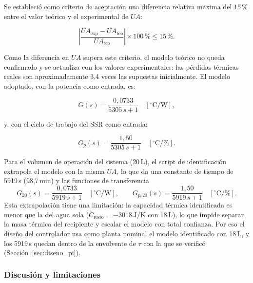 Se estableció como criterio de aceptación una diferencia relativa máxima del $15\,\%$ entre el valor teórico y el experimental de $UA$:

\begin{equation}
\left| \frac{UA_{\mathrm{exp}} - UA_{\mathrm{teo}}}{UA_{\mathrm{teo}}} \right| \times 100\,\% \leq 15\,\%.
\label{eq:criterio_aceptacion}
\end{equation}

Como la diferencia en $UA$ supera este criterio, el modelo teórico no queda confirmado y se actualiza con los valores experimentales: las pérdidas térmicas reales son aproximadamente 3,4 veces las supuestas inicialmente. El modelo adoptado, con la potencia como entrada, es:

\begin{equation}
G(s) = \frac{0{,}0733}{5305\,s + 1}\quad [^{\circ}\mathrm{C/W}],
\label{eq:modelo_experimental}
\end{equation}

y, con el ciclo de trabajo del SSR como entrada:

\begin{equation}
G_p(s) = \frac{1{,}50}{5305\,s + 1}\quad [^{\circ}\mathrm{C}/\%].
\label{eq:modelo_experimental_duty}
\end{equation}

Para el volumen de operación del sistema (20\,L), el script de identificación extrapola el modelo con la misma $UA$, lo que da una constante de tiempo de 5919\,s (98,7\,min) y las funciones de transferencia
\begin{equation}
G_{20}(s) = \frac{0{,}0733}{5919\,s + 1}\quad [^{\circ}\mathrm{C/W}], \qquad G_{p,20}(s) = \frac{1{,}50}{5919\,s + 1}\quad [^{\circ}\mathrm{C}/\%].
\label{eq:modelo_20L}
\end{equation}
Esta extrapolación tiene una limitación: la capacidad térmica identificada es menor que la del agua sola ($C_{\mathrm{resto}} = -3018\,\mathrm{J/K}$ con 18\,L), lo que impide separar la masa térmica del recipiente y escalar el modelo con total confianza. Por eso el diseño del controlador usa como planta nominal el modelo identificado con 18\,L, y los 5919\,s quedan dentro de la envolvente de $\tau$ con la que se verificó (Sección~\ref{sec:diseno_pi}).

\subsubsection{Discusión y limitaciones}

